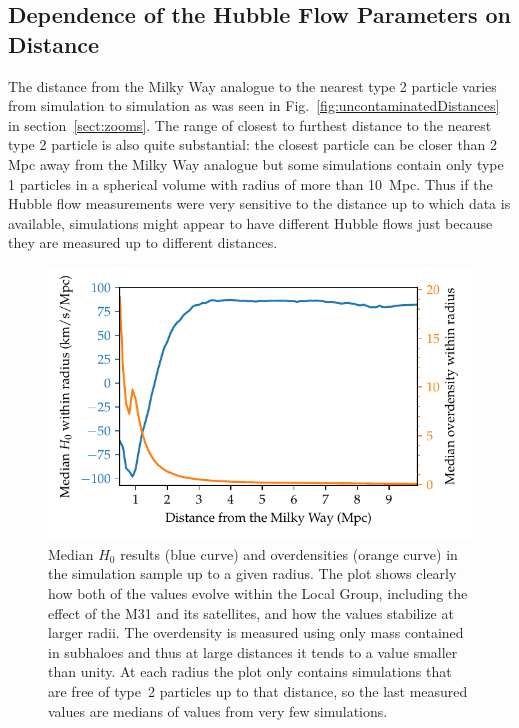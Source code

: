 \documentclass[english, oneside]{HYgradu}
\begin{document}
\subsection{Dependence of the Hubble Flow Parameters on Distance}
The distance from the Milky Way analogue to the nearest type 2 particle varies from simulation to simulation as was seen in Fig.~\ref{fig:uncontaminatedDistances} in section~\ref{sect:zooms}. The range of closest to furthest distance to the nearest type 2 particle is also quite substantial: the closest particle can be closer than 2 Mpc away from the Milky Way analogue but some simulations contain only type 1 particles in a spherical volume with radius of more than 10~Mpc. Thus if the Hubble flow measurements were very sensitive to the distance up to which data is available, simulations might appear to have different Hubble flows just because they are measured up to different distances.

\begin{figure}
    \centering
    \includegraphics{kuvat/overdensity+H0.pdf}
    \caption{Median $H_0$ results (blue curve) and overdensities (orange curve) in the simulation sample up to a given radius. The plot shows clearly how both of the values evolve within the Local Group, including the effect of the M31 and its satellites, and how the values stabilize at larger radii. The overdensity is measured using only mass contained in subhaloes and thus at large distances it tends to a value smaller than unity. At each radius the plot only contains simulations that are free of type~2 particles up to that distance, so the last measured values are medians of values from very few simulations.}\label{fig:overdensity+H0}
\end{figure}
\end{document}
